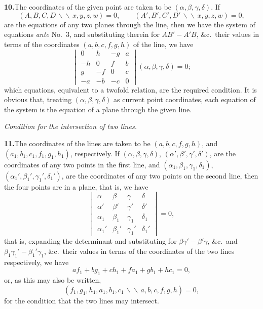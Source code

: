 \documentclass[11pt,a4paper]{article}
\begin{document}
\textbf{10.}\quad The coordinates of the given point are taken to be
$(\alpha, \beta, \gamma, \delta)$. If
\[
(A, B, C, D \,\backslash\!\!\backslash\, x, y, z, w) = 0, \qquad
(A', B', C', D' \,\backslash\!\!\backslash\, x, y, z, w) = 0,
\]
are the equations of any two planes through the line, then we have the system
of equations \textit{ante} No.~3, and substituting therein for $AB' - A'B$,
\&c.\ their values in terms of the coordinates $(a, b, c, f, g, h)$ of the
line, we have
\[
\begin{vmatrix}
0 & h & -g & a \\
-h & 0 & f & b \\
g & -f & 0 & c \\
-a & -b & -c & 0
\end{vmatrix}(\alpha, \beta, \gamma, \delta) = 0;
\]
which equations, equivalent to a twofold relation, are the required condition.
It is obvious that, treating $(\alpha, \beta, \gamma, \delta)$ as current point
coordinates, each equation of the system is the equation of a plane through
the given line.

\medskip
\noindent\textit{Condition for the intersection of two lines.}
\medskip

\textbf{11.}\quad The coordinates of the lines are taken to be
$(a, b, c, f, g, h)$, and $(a_{1}, b_{1}, c_{1}, f_{1}, g_{1}, h_{1})$,
respectively. If $(\alpha, \beta, \gamma, \delta)$,
$(\alpha', \beta', \gamma', \delta')$, are the coordinates of any two points in
the first line, and $(\alpha_{1}, \beta_{1}, \gamma_{1}, \delta_{1})$,
$(\alpha_{1}', \beta_{1}', \gamma_{1}', \delta_{1}')$, are the coordinates of
any two points on the second line, then the four points are in a plane, that
is, we have
\[
\begin{vmatrix}
\alpha & \beta & \gamma & \delta \\
\alpha' & \beta' & \gamma' & \delta' \\
\alpha_{1} & \beta_{1} & \gamma_{1} & \delta_{1} \\
\alpha_{1}' & \beta_{1}' & \gamma_{1}' & \delta_{1}'
\end{vmatrix} = 0,
\]
that is, expanding the determinant and substituting for
$\beta\gamma' - \beta'\gamma$, \&c.\ and
$\beta_{1}\gamma_{1}' - \beta_{1}'\gamma_{1}$, \&c.\ their values in terms of
the coordinates of the two lines respectively, we have
\[
a f_{1} + b g_{1} + c h_{1} + f a_{1} + g b_{1} + h c_{1} = 0,
\]
or, as this may also be written,
\[
(f_{1}, g_{1}, h_{1}, a_{1}, b_{1}, c_{1} \,\backslash\!\!\backslash\, a, b, c, f, g, h) = 0,
\]
for the condition that the two lines may intersect.
\end{document}
